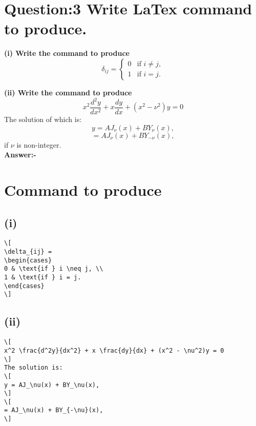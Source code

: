 \newpage
\section*{Question:3 Write LaTex command to produce.}
\textbf{(i) Write the command to produce}
\[
\delta_{ij} = 
\begin{cases} 
0 & \text{if } i \neq j, \\
1 & \text{if } i = j.
\end{cases}
\]

\textbf{(ii) Write the command to produce}
\[
x^2 \frac{d^2y}{dx^2} + x \frac{dy}{dx} + (x^2 - \nu^2)y = 0
\]
The solution of which is:
\[
y = AJ_\nu(x) + BY_\nu(x),
\]
\[
= AJ_\nu(x) + BY_{-\nu}(x),
\]
\vspace{0.5cm}
if $\nu$ is non-integer.\\

\textbf{Answer:-}
\section*{Command to produce}
\subsection*{(i)}
\begin{verbatim}
\[
\delta_{ij} = 
\begin{cases} 
0 & \text{if } i \neq j, \\
1 & \text{if } i = j.
\end{cases}
\]

\end{verbatim}
\vspace{0.5cm}
\subsection*{(ii)}
\begin{verbatim}
\[
x^2 \frac{d^2y}{dx^2} + x \frac{dy}{dx} + (x^2 - \nu^2)y = 0
\]
The solution is:
\[
y = AJ_\nu(x) + BY_\nu(x),
\]
\[
= AJ_\nu(x) + BY_{-\nu}(x),
\]  
\end{verbatim}